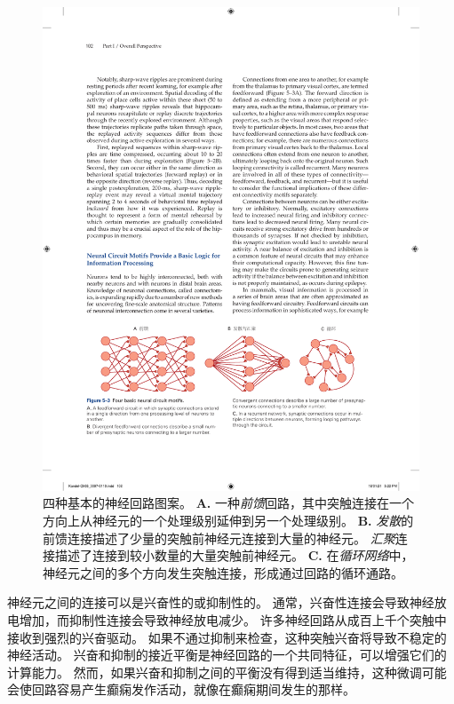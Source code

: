 \begin{figure}[htbp]
	\centering
	\includegraphics[width=1.0\linewidth]{chap05/fig_5_3}
	\caption{四种基本的神经回路图案。 
		\textbf{A.} 一种\textit{前馈}回路，其中突触连接在一个方向上从神经元的一个处理级别延伸到另一个处理级别。
		\textbf{B.} \textit{发散}的前馈连接描述了少量的突触前神经元连接到大量的神经元。
		\textit{汇聚}连接描述了连接到较小数量的大量突触前神经元。
		\textbf{C.} 在\textit{循环网络}中，神经元之间的多个方向发生突触连接，形成通过回路的循环通路。}
	\label{fig:5_3}
\end{figure}


神经元之间的连接可以是兴奋性的或抑制性的。
通常，兴奋性连接会导致神经放电增加，而抑制性连接会导致神经放电减少。
许多神经回路从成百上千个突触中接收到强烈的兴奋驱动。
如果不通过抑制来检查，这种突触兴奋将导致不稳定的神经活动。
兴奋和抑制的接近平衡是神经回路的一个共同特征，可以增强它们的计算能力。
然而，如果兴奋和抑制之间的平衡没有得到适当维持，这种微调可能会使回路容易产生癫痫发作活动，就像在癫痫期间发生的那样。


